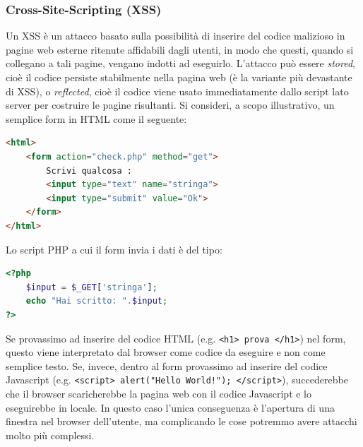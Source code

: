\subsubsection{Cross-Site-Scripting (XSS)}
Un XSS è un attacco basato sulla possibilità di inserire del codice malizioso in pagine web esterne ritenute affidabili dagli utenti, in modo che questi, quando si collegano a tali pagine, vengano indotti ad eseguirlo. L'attacco può essere \textit{stored}, cioè il codice persiste stabilmente nella pagina web (è la variante più devastante di XSS), o \textit{reflected}, cioè il codice viene usato immediatamente dallo script lato server per costruire le pagine risultanti. Si consideri, a scopo illustrativo, un semplice form in HTML come il seguente:
\begin{lstlisting}[language=html]
<html>
	<form action="check.php" method="get">
		Scrivi qualcosa :
		<input type="text" name="stringa">
		<input type="submit" value="Ok">
	</form>
</html>
\end{lstlisting}
Lo script PHP a cui il form invia i dati è del tipo:
\begin{lstlisting}[language=php]
<?php
	$input = $_GET['stringa'];
	echo "Hai scritto: ".$input;
?>
\end{lstlisting}
Se provassimo ad inserire del codice HTML (e.g. \texttt{<h1> prova </h1>}) nel form, questo viene interpretato dal browser come codice da eseguire e non come semplice testo. Se, invece, dentro al form provassimo ad inserire del codice Javascript (e.g. \texttt{<script> alert("Hello World!"); </script>}), succederebbe che il browser scaricherebbe la pagina web con il codice Javascript e lo eseguirebbe in locale. In questo caso l'unica conseguenza è l'apertura di una finestra nel browser dell'utente, ma complicando le cose potremmo avere attacchi molto più complessi.

